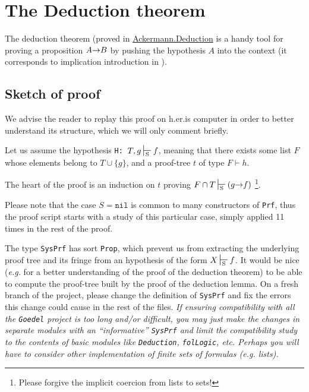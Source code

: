 \section{The Deduction theorem}

The deduction theorem (proved in \href{../theories/html/hydras.Ackermann.Deduction.html}{Ackermann.Deduction} is a handy 
tool for proving a proposition $A\mbox{$\rightarrow$} B$ by pushing 
the hypothesis $A$ into the context (it corresponds to 
implication introduction in \coq).



\subsection{Sketch of proof}

We advise the reader to replay this proof on h.er.is computer
 in order to better understand its structure, which we will only comment briefly.

Let us assume the hypothesis \texttt{H: $T, g \sdash f$},
meaning that there exists some list $F$ whose elements 
belong to $T \cup \{g\}$, and a proof-tree $t$ of type
$F \vdash h$.

The heart of the proof is an induction on $t$ proving 
$F \cap T \sdash (g\arrow f)$ \footnote{Please forgive the implicit coercion from lists to sets!}. 

Please note that the case $S=\texttt{nil}$ is common to 
many constructors of \texttt{Prf}, thus the proof script starts
with a study of this particular case, simply applied 11 times in the rest of the proof. 


\begin{project}[**]
  The type \texttt{SysPrf} has sort \texttt{Prop}, which prevent us from
extracting the underlying proof tree and its fringe from an hypothesis 
of the form $X\sdash f$. 
It would be nice (\emph{e.g.} for a better understanding of the proof of the deduction theorem) to be able to compute the  proof-tree built
by the proof of the deduction lemma. 
On a fresh branch of the project, please change the definition of
\texttt{SysPrf} and fix the errors this change could cause in the rest of the files. 
\emph{If ensuring compatibility with all the \texttt{Goedel} project is too long and/or difficult, you may just make the changes in separate modules with an ``informative'' \texttt{SysPrf} and limit the compatibility study  to the contents of basic modules like
\texttt{Deduction}, \texttt{folLogic}, etc.
Perhaps you will have to consider other implementation of finite sets of formulas (\emph{e.g.} lists).
}

\end{project}





